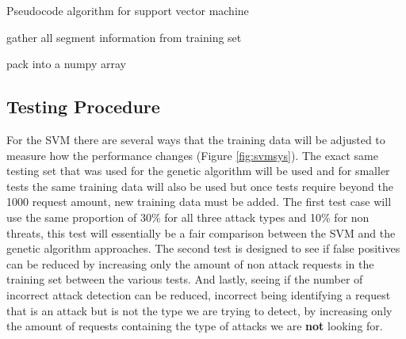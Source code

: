 \begin{algorithm}[H]
	\caption{Pseudocode algorithm for support vector machine}
	\label{alg:svm}
	
	gather all segment information from training set\;
	
	pack into a numpy array\;
	
\end{algorithm}

\subsection{Testing Procedure}

For the SVM there are several ways that the training data will be adjusted to measure how the performance changes (Figure \ref{fig:svmsys}).  The exact same testing set that was used for the genetic algorithm will be used and for smaller tests the same training data will also be used but once tests require beyond the 1000 request amount, new training data must be added.  The first test case will use the same proportion of 30\% for all three attack types and 10\% for non threats, this test will essentially be a fair comparison between the SVM and the genetic algorithm approaches.  The second test is designed to see if false positives can be reduced by increasing only the amount of non attack requests in the training set between the various tests.  And lastly, seeing if the number of incorrect attack detection can be reduced, incorrect being identifying a request that is an attack but is not the type we are trying to detect, by increasing only the amount of requests containing the type of attacks we are \textbf{not} looking for.
